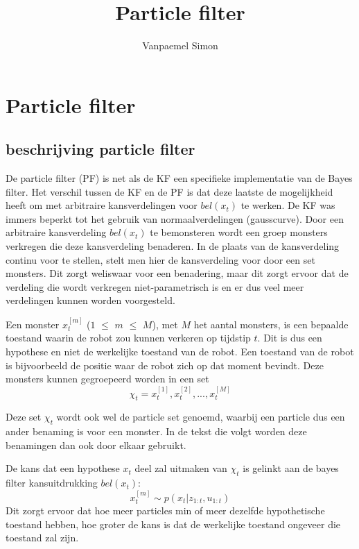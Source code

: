 \documentclass{book}
\title{Particle filter}
\author{Vanpaemel Simon}
\begin{document}
\maketitle

\chapter{Particle filter}
\section{beschrijving particle filter}
De particle filter (PF) is net als de KF een specifieke implementatie van de Bayes filter.
Het verschil tussen de KF en de PF is dat deze laatste de mogelijkheid heeft om met arbitraire kansverdelingen voor $bel(x_{t})$ te werken. De KF was immers beperkt tot het gebruik van normaalverdelingen (gausscurve). Door een arbitraire kansverdeling $bel(x_{t})$ te bemonsteren wordt een groep monsters verkregen die deze kansverdeling benaderen. In de plaats van de kansverdeling continu voor te stellen, stelt men hier de kansverdeling voor door een set monsters. Dit zorgt weliswaar voor een benadering, maar dit zorgt ervoor dat de verdeling die wordt verkregen niet-parametrisch is en er dus veel meer verdelingen kunnen worden voorgesteld.

Een monster $x_{t}^{[m]}$ ($1$ $\leqslant$ $m$ $\leqslant$ $M$), met $M$ het aantal monsters, is een bepaalde toestand waarin de robot zou kunnen verkeren op tijdstip $t$. Dit is dus een hypothese en niet de werkelijke toestand van de robot. Een toestand van de robot is bijvoorbeeld de positie waar de robot zich op dat moment bevindt.
Deze monsters kunnen gegroepeerd worden in een set 
\begin{equation}
\chi_{t} =x_{t}^{[1]}, x_{t}^{[2]},...,x_{t}^{[M]}
\end{equation}

Deze set $\chi_{t}$ wordt ook wel de particle set genoemd, waarbij een particle dus een ander benaming is voor een monster. In de tekst die volgt worden deze benamingen dan ook door elkaar gebruikt.

De kans dat een hypothese $x_{t}$ deel zal uitmaken van $\chi_{t}$ is gelinkt aan de bayes filter kansuitdrukking $bel(x_{t})$:
\begin{equation}
x_{t}^{[m]}  \sim p( x_{t} | z_{1:t}  ,  u_{1:t}) 
\end{equation}
Dit zorgt ervoor dat hoe meer particles min of meer dezelfde hypothetische toestand hebben, hoe groter de kans is dat de werkelijke toestand ongeveer die toestand zal zijn.
\end{document}
